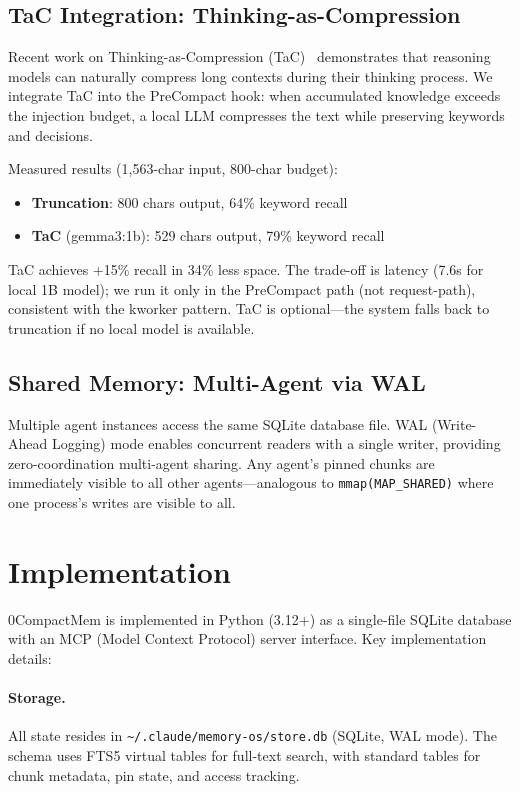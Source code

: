 \documentclass[10pt,twocolumn]{article}
\begin{document}
\subsection{TaC Integration: Thinking-as-Compression}

Recent work on Thinking-as-Compression (TaC)~\cite{tac2026} demonstrates that reasoning models can naturally compress long contexts during their thinking process. We integrate TaC into the PreCompact hook: when accumulated knowledge exceeds the injection budget, a local LLM compresses the text while preserving keywords and decisions.

Measured results (1{,}563-char input, 800-char budget):
\begin{itemize}[leftmargin=*,nosep]
  \item \textbf{Truncation}: 800 chars output, 64\% keyword recall
  \item \textbf{TaC} (gemma3:1b): 529 chars output, 79\% keyword recall
\end{itemize}
TaC achieves +15\% recall in 34\% less space. The trade-off is latency (7.6s for local 1B model); we run it only in the PreCompact path (not request-path), consistent with the kworker pattern. TaC is optional---the system falls back to truncation if no local model is available.

\subsection{Shared Memory: Multi-Agent via WAL}

Multiple agent instances access the same SQLite database file. WAL (Write-Ahead Logging) mode enables concurrent readers with a single writer, providing zero-coordination multi-agent sharing. Any agent's pinned chunks are immediately visible to all other agents---analogous to \texttt{mmap(MAP\_SHARED)} where one process's writes are visible to all.

\section{Implementation}
\label{sec:impl}

0CompactMem is implemented in Python (3.12+) as a single-file SQLite database with an MCP (Model Context Protocol) server interface. Key implementation details:

\paragraph{Storage.} All state resides in \texttt{\~{}/.claude/memory-os/store.db} (SQLite, WAL mode). The schema uses FTS5 virtual tables for full-text search, with standard tables for chunk metadata, pin state, and access tracking.
\end{document}
